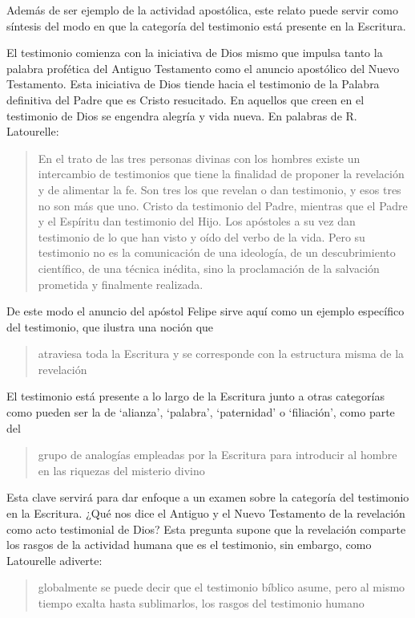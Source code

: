 Además de ser ejemplo de la actividad apostólica, este relato puede servir como síntesis del modo en que la categoría del testimonio está presente en la Escritura.

El testimonio comienza con la iniciativa de Dios mismo que impulsa tanto la palabra profética del Antiguo Testamento como el anuncio apostólico del Nuevo Testamento. Esta iniciativa de Dios tiende hacia el testimonio de la Palabra definitiva del Padre que es Cristo resucitado. En aquellos que creen en el testimonio de Dios se engendra alegría y vida nueva. En palabras de R. Latourelle: \blockquote[{\cite[1530]{latourelle2000testimonio}}]{En el trato de las tres personas divinas con los hombres existe un intercambio de testimonios que tiene la finalidad de proponer la revelación y de alimentar la fe. Son tres los que revelan o dan testimonio, y esos tres no son más que uno. Cristo da testimonio del Padre, mientras que el Padre y el Espíritu dan testimonio del Hijo. Los apóstoles a su vez dan testimonio de lo que han visto y oído del verbo de la vida. Pero su testimonio no es la comunicación de una ideología, de un descubrimiento científico, de una técnica inédita, sino la proclamación de la salvación prometida y finalmente realizada.}

De este modo el anuncio del apóstol Felipe sirve aquí como un ejemplo específico del testimonio, que ilustra una noción que \blockquote[{\cite[109]{prades2015testimonio}}]{atraviesa toda la Escritura y se corresponde con la estructura misma de la revelación}. El testimonio está presente a lo largo de la Escritura junto a otras categorías como pueden ser la de `alianza', `palabra', `paternidad' o `filiación', como parte del \blockquote[{\cite[1523]{latourelle2000testimonio}}]{grupo de analogías empleadas por la Escritura para introducir al hombre en las riquezas del misterio divino}.

Esta clave servirá para dar enfoque a un examen sobre la categoría del testimonio en la Escritura. ¿Qué nos dice el Antiguo y el Nuevo Testamento de la revelación como acto testimonial de Dios? Esta pregunta supone que la revelación comparte los rasgos de la actividad humana que es el testimonio, sin embargo, como Latourelle adiverte: \blockquote[{\cite[1526]{latourelle2000testimonio}}]{globalmente se puede decir que el testimonio bíblico asume, pero al mismo tiempo exalta hasta sublimarlos, los rasgos del testimonio humano}.

